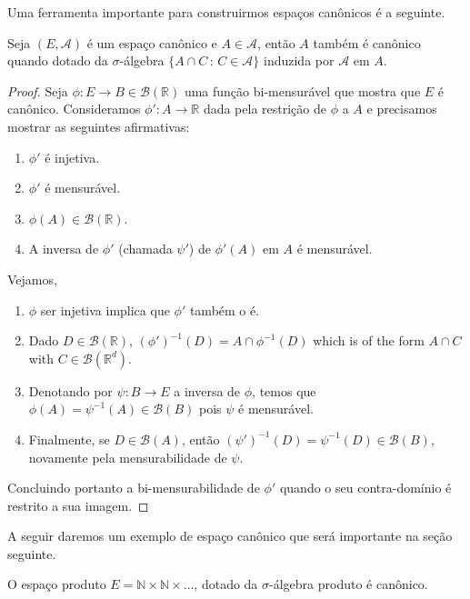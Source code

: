Uma ferramenta importante para construirmos espaços canônicos é a seguinte.

\begin{lemma}
  \label{l:mensur_de_canonico}
  Seja $(E, \mathcal{A})$ é um espaço canônico e $A \in \mathcal{A}$, então $A$ também é canônico quando dotado da $\sigma$-álgebra $\{A \cap C\, : \, C \in \mathcal{A}\}$ induzida por $\mathcal{A}$ em $A$.
\end{lemma}

\begin{proof}
  Seja $\phi: E \to B \in \mathcal{B}(\mathbb{R})$ uma função bi-mensurável que mostra que $E$ é canônico.
  Consideramos $\phi': A \to \mathbb{R}$ dada pela restrição de $\phi$ a $A$ e precisamos mostrar as seguintes afirmativas:
  \begin{enumerate}[\quad a)]
  \item $\phi'$ é injetiva.
  \item $\phi'$ é mensurável.
  \item $\phi(A)\in \mathcal{B}(\mathbb{R})$.
  \item A inversa de $\phi'$ (chamada $\psi'$) de $\phi'(A)$ em $A$ é mensurável.
  \end{enumerate}
  Vejamos,
  \begin{enumerate}[\quad a)]
  \item $\phi$ ser injetiva implica que $\phi'$ também o é.
  \item Dado $D \in \mathcal{B}(\mathbb{R})$, $(\phi')^{-1}(D) = A \cap \phi^{-1}(D)$ which is of the form $A\cap C$ with $C\in \mathcal{B}(\mathbb{R}^d)$.
  \item Denotando por $\psi: B \to E$ a inversa de $\phi$, temos que $\phi(A) = \psi^{-1}(A) \in \mathcal{B}(B)$ pois $\psi$ é mensurável.
  \item Finalmente, se $D \in \mathcal{B}(A)$, então $(\psi')^{-1}(D) = \psi^{-1}(D) \in \mathcal{B}(B)$, novamente pela mensurabilidade de $\psi$.
  \end{enumerate}
  Concluindo portanto a bi-mensurabilidade de $\phi'$ quando o seu contra-domínio é restrito a sua imagem.
\end{proof}

A seguir daremos um exemplo de espaço canônico que será importante na seção seguinte.

\begin{lemma}
  \label{l:NN_canonico}
  O espaço produto $E = \mathbb{N} \times \mathbb{N} \times \dots$, dotado da $\sigma$-álgebra produto é canônico.
\end{lemma}

